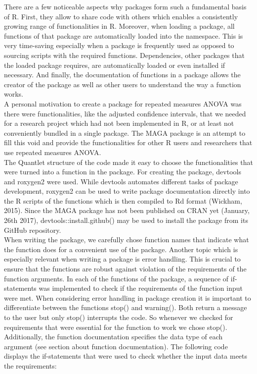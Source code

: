 \documentclass[11pt]{article}
\begin{document}
		There are a few noticeable aspects why packages form such a fundamental basis of R. First, they allow to share code with others which enables a consistently growing range of functionalities in R. Moreover, when loading a package, all functions of that package are automatically loaded into the namespace. This is very time-saving especially when a package is frequently used as opposed to sourcing scripts with the required functions. Dependencies, other packages that the loaded package requires, are automatically loaded or even installed if necessary. And finally, the documentation of functions in a package allows the creator of the package as well as other users to understand the way a function works.\\
		
		A personal motivation to create a package for repeated measures ANOVA was there were functionalities, like the adjusted confidence intervals, that we needed for a research project which had not been implemented in R, or at least not conveniently bundled in a single package. The MAGA package is an attempt to fill this void and provide the functionalities for other R users and researchers that use repeated measures ANOVA.\\
		
		The Quantlet structure of the code made it easy to choose the functionalities that were turned into a function in the package. For creating the package, devtools \citep{wickham2015devtools} and roxygen2 \citep{wickham2013roxygen2} were used. While devtools automates different tasks of package development, roxygen2 can be used to write package documentation directly into the R scripts of the functions which is then compiled to Rd format (Wickham, 2015). Since the MAGA package has not been published on CRAN yet (January, 26th 2017), devtools::install.github() may be used to install the package from its GitHub repository.\\
		
		When writing the package, we carefully chose function names that indicate what the function does for a convenient use of the package. Another topic which is especially relevant when writing a package is error handling. This is crucial to ensure that the functions are robust against violation of the requirements of the function arguments. In each of the functions of the package, a sequence of if-statements was implemented to check if the requirements of the function input were met. When considering error handling in package creation it is important to differentiate between the functions stop() and warning(). Both return a message to the user but only stop() interrupts the code. So whenever we checked for requirements that were essential for the function to work we chose stop(). Additionally, the function documentation specifies the data type of each argument (see section about function documentation).
		The following code displays the if-statements that were used to check whether the input data meets the requirements:\\
		
\end{document}
